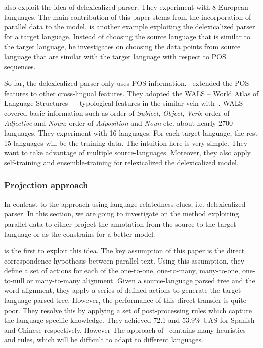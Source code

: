 \documentclass[12pt,twoside,final,hidelinks]{ltthesis}
\theoremstyle{definition}
\begin{document}
 also exploit the idea of delexicalized parser. They experiment with 8 European languages. The main contribution of this paper stems from the incorporation of parallel data to the model. %
 is another example exploiting the delexicalized parser for a target language. Instead of choosing the source language that is similar to the target language, he investigates on choosing the data points from source language that are similar with the target language with respect to POS sequences.

So far, the delexicalized parser only uses POS information.~ extended the POS features to other cross-lingual features. They adopted the WALS -- World Atlas of Language Structures~\cite{wals} --  typological features in the similar vein with~\cite{Naseem:2012:SSM}. WALS covered basic information such as order of \textit{Subject}, \textit{Object}, \textit{Verb}; order of \textit{Adjective} and \textit{Noun}; order of \textit{Adposition} and \textit{Noun} etc.  about nearly 2700 languages. They experiment with 16 languages. For each target language, the rest 15 languages will be the training data. The intuition here is very simple. They want to take advantage of multiple source-languages. Moreover, they also apply self-training and ensemble-training for relexicalized the delexicalized model. 

\subsubsection{Projection approach}
In contrast to the approach using language relatedness clues, i.e. delexicalized parser. In this section, we are going to investigate on the method exploiting parallel data to either project the annotation from the source to the target language or as the constrains for a better model. 

 is the first to exploit this idea. The key assumption of this paper is the direct correspondence hypothesis between parallel text. Using this assumption, they define a set of actions for each of the one-to-one, one-to-many, many-to-one, one-to-null or many-to-many alignment. Given a source-language parsed tree and the word alignment, they apply a series of defined actions to generate the target-language parsed tree. However, the performance of this direct transfer is quite poor. They resolve this by applying a set of post-processing rules which capture the language specific knowledge. They achieved 72.1 and 53.9\% UAS for Spanish and Chinese respectively. However The approach of~ contains many heuristics and rules, which will be difficult to adapt to different languages. 
\end{document}
